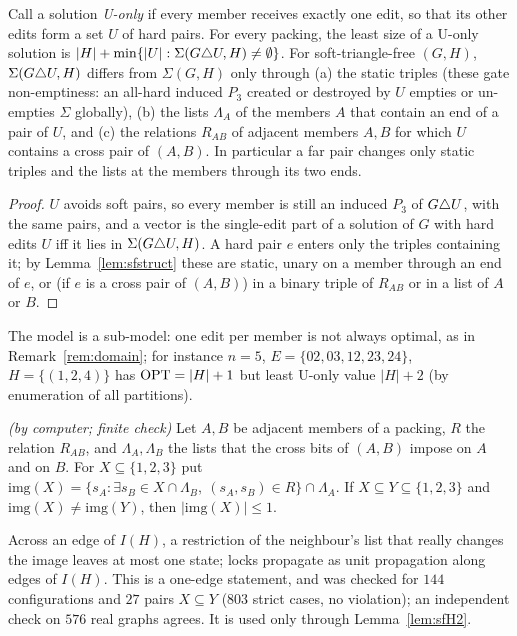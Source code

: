 \begin{lemma}\label{lem:sfU}
Call a solution \emph{U-only} if every member receives exactly one edit, so that its other edits form a set $U$ of hard pairs. For every packing, the least size of a U-only solution is $|H|+\min\{|U|:\Sigma(G\triangle U,H)\ne\emptyset\}$. For soft-triangle-free $(G,H)$, $\Sigma(G\triangle U,H)$ differs from $\Sigma(G,H)$ only through (a) the static triples (these gate non-emptiness: an all-hard induced $P_3$ created or destroyed by $U$ empties or un-empties $\Sigma$ globally), (b) the lists $\Lambda_A$ of the members $A$ that contain an end of a pair of $U$, and (c) the relations $R_{AB}$ of adjacent members $A,B$ for which $U$ contains a cross pair of $(A,B)$. In particular a far pair changes only static triples and the lists at the members through its two ends.
\end{lemma}
\begin{proof}
$U$ avoids soft pairs, so every member is still an induced $P_3$ of $G\triangle U$, with the same pairs, and a vector is the single-edit part of a solution of $G$ with hard edits $U$ iff it lies in $\Sigma(G\triangle U,H)$. A hard pair $e$ enters only the triples containing it; by Lemma~\ref{lem:sfstruct} these are static, unary on a member through an end of $e$, or (if $e$ is a cross pair of $(A,B)$) in a binary triple of $R_{AB}$ or in a list of $A$ or $B$.
\end{proof}
The model is a sub-model: one edit per member is not always optimal, as in Remark~\ref{rem:domain}; for instance $n=5$, $E=\{02,03,12,23,24\}$, $H=\{(1,2,4)\}$ has $\mathrm{OPT}=|H|+1$ but least U-only value $|H|+2$ (by enumeration of all partitions).

\begin{lemma}[Strictness]\label{lem:sfS}
\emph{(by computer; finite check)} Let $A,B$ be adjacent members of a packing, $R$ the relation $R_{AB}$, and $\Lambda_A,\Lambda_B$ the lists that the cross bits of $(A,B)$ impose on $A$ and on $B$. For $X\subseteq\{1,2,3\}$ put $\mathrm{img}(X)=\{s_A:\exists s_B\in X\cap\Lambda_B,\ (s_A,s_B)\in R\}\cap\Lambda_A$. If $X\subseteq Y\subseteq\{1,2,3\}$ and $\mathrm{img}(X)\ne\mathrm{img}(Y)$, then $|\mathrm{img}(X)|\le1$.
\end{lemma}
Across an edge of $I(H)$, a restriction of the neighbour's list that really changes the image leaves at most one state; locks propagate as unit propagation along edges of $I(H)$. This is a one-edge statement, and was checked for $144$ configurations and $27$ pairs $X\subseteq Y$ ($803$ strict cases, no violation); an independent check on $576$ real graphs agrees. It is used only through Lemma~\ref{lem:sfH2}.

